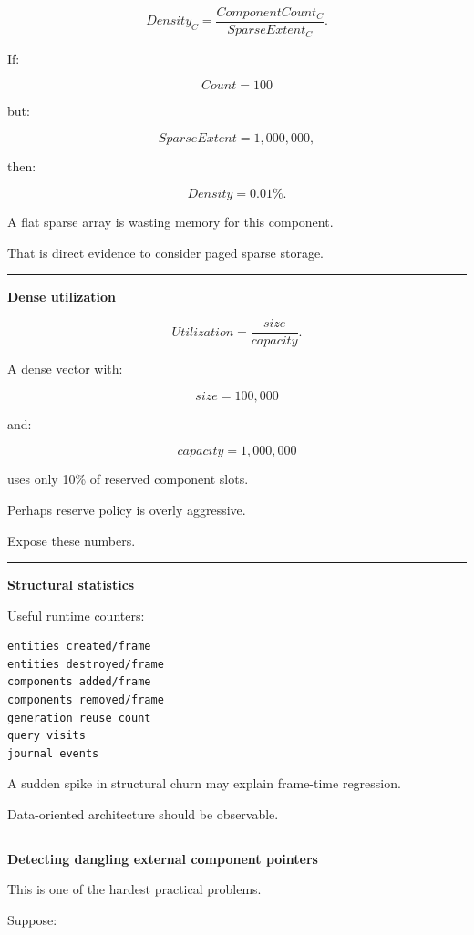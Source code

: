 \[
Density_C=
\frac{ComponentCount_C}
{SparseExtent_C}.
\]

If:

\[
Count=100
\]

but:

\[
SparseExtent=1,000,000,
\]

then:

\[
Density=0.01\%.
\]

A flat sparse array is wasting memory for this component.

That is direct evidence to consider paged sparse storage.

\begin{center}\rule{0.5\linewidth}{0.5pt}\end{center}

\textbf{Dense utilization}

\[
Utilization=
\frac{size}
{capacity}.
\]

A dense vector with:

\[
size=100,000
\]

and:

\[
capacity=1,000,000
\]

uses only 10\% of reserved component slots.

Perhaps reserve policy is overly aggressive.

Expose these numbers.

\begin{center}\rule{0.5\linewidth}{0.5pt}\end{center}

\textbf{Structural statistics}

Useful runtime counters:

\begin{verbatim}
entities created/frame
entities destroyed/frame
components added/frame
components removed/frame
generation reuse count
query visits
journal events
\end{verbatim}

A sudden spike in structural churn may explain frame-time regression.

Data-oriented architecture should be observable.

\begin{center}\rule{0.5\linewidth}{0.5pt}\end{center}

\textbf{Detecting dangling external component pointers}

This is one of the hardest practical problems.

Suppose:

